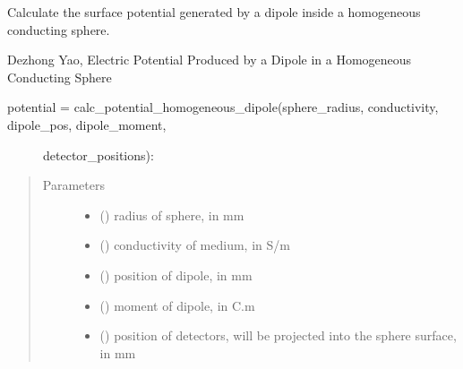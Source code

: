 \documentclass[letterpaper,10pt,english,openany,oneside]{sphinxmanual}
\begin{document}
\begin{fulllineitems}
\label{\detokenize{pygpc:pygpc.testfun.calc_potential_homogeneous_dipole}}
Calculate the surface potential generated by a dipole inside a homogeneous conducting sphere.

Dezhong Yao, Electric Potential Produced by a Dipole in a Homogeneous
Conducting Sphere
\begin{description}
\item[{potential = calc\_potential\_homogeneous\_dipole(sphere\_radius, conductivity, dipole\_pos, dipole\_moment,}] \leavevmode
detector\_positions):

\end{description}
\begin{quote}\begin{description}
\item[{Parameters}] \leavevmode\begin{itemize}
\item {} 
 () \textendash{} radius of sphere, in mm

\item {} 
 () \textendash{} conductivity of medium, in S/m

\item {} 
 (\sphinxstyleliteralemphasis{\sphinxupquote{{[}}}\sphinxstyleliteralemphasis{\sphinxupquote{{]} }}) \textendash{} position of dipole, in mm

\item {} 
 (\sphinxstyleliteralemphasis{\sphinxupquote{{[}}}\sphinxstyleliteralemphasis{\sphinxupquote{{]} }}) \textendash{} moment of dipole, in C.m

\item {} 
 (\sphinxstyleliteralemphasis{\sphinxupquote{{[}}}\sphinxstyleliteralemphasis{\sphinxupquote{{]} }}) \textendash{} position of detectors, will be projected into the sphere surface, in mm


\end{itemize}
\end{description}
\end{quote}
\end{fulllineitems}
\end{document}

